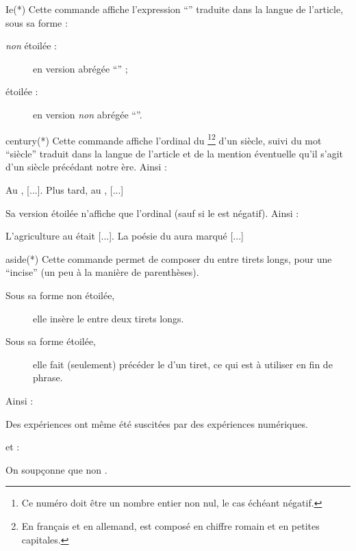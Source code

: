 \begin{docCommand}{Ie(*)}{}
  Cette commande affiche l'expression \enquote{\Ie*{}} traduite dans la langue
  de l'article, sous sa forme :
  \begin{description}
  \item[\emph{non} étoilée :] en version abrégée \enquote{\Ie{}} ;
  \item[étoilée :] en version \emph{non} abrégée \enquote{\Ie*{}}.
  \end{description}
\end{docCommand}

\begin{docCommand}{century(*)}{}
  Cette commande affiche l'ordinal du \footnote{Ce numéro doit être
    un nombre entier non nul, le cas échéant négatif.}\footnote{En français et en
    allemand,  est composé en chiffre romain et en petites
    capitales.} d'un siècle, suivi du mot \enquote{siècle} traduit dans la
  langue de l'article et de la mention éventuelle qu'il s'agit d'un siècle
  précédant notre ère. Ainsi :
\begin{bodycode}
Au , [...]. Plus tard, au , [...]
\end{bodycode}
  Sa version étoilée n'affiche que l'ordinal (sauf si le  est
  négatif). Ainsi :
\begin{bodycode}
L'agriculture au  était [...].
La poésie du  aura marqué [...]
\end{bodycode}
\end{docCommand}

\begin{docCommand}{aside(*)}{}
  Cette commande permet de composer du  entre tirets longs, pour une
  \enquote{incise} (un peu à la manière de parenthèses).
  \begin{description}
  \item[Sous sa forme non étoilée,] elle insère le  entre deux
    tirets longs.
  \item[Sous sa forme étoilée,] elle fait (seulement) précéder le 
    d'un tiret, ce qui est à utiliser en fin de phrase.
  \end{description}
  Ainsi :
\begin{bodycode}
Des expériences  ont même été
suscitées par des expériences numériques.
\end{bodycode}
  et :
\begin{bodycode}[listing and text,listing options={deletekeywords={exemple}}]
On soupçonne que non .
\end{bodycode}
\end{docCommand}


